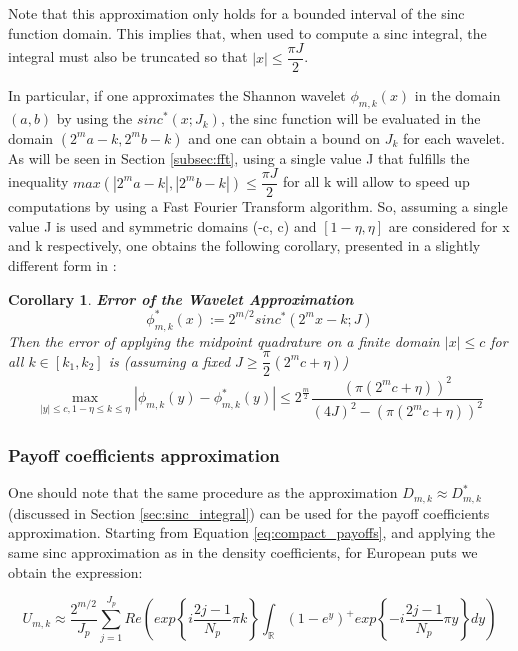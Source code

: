 \documentclass[12,twoside]{mammeTFM}
\newtheorem{cor}[thm]{Corollary}
\theoremstyle{definition}
\theoremstyle{remark}
\newcommand{\R}{\ensuremath{\mathbb{R}}}
\begin{document}
Note that this approximation only holds for a bounded interval of the sinc function domain. This implies that, when used to compute a sinc integral, the integral must also be truncated so that $|x| \leq \dfrac{\pi J}{2}$.

In particular, if one approximates the Shannon wavelet $\phi_{m,k}(x)$ in the domain $(a, b)$ by using the $sinc^{*}(x;J_k)$, the sinc function will be evaluated in the domain $(2^m a - k, 2^m b - k)$ and one can obtain a bound on $J_k$ for each wavelet. As will be seen in Section \ref{subsec:fft}, using a single value J that fulfills the inequality $max(|2^m a - k|, |2^m b - k|) \leq \dfrac{\pi J}{2}$ for all k will allow to speed up computations by using a Fast Fourier Transform algorithm. So, assuming a single value J is used and symmetric domains (-c, c) and $[1 - \eta, \eta]$ are considered for x and k respectively, one obtains the following corollary, presented in a slightly different form in \cite{mar17}:
\begin{cor} \textbf{Error of the Wavelet Approximation}
\begin{equation}
\phi_{m,k}^{*}(x) := 2^{m/2} sinc^{*}(2^m x -k; J)
\end{equation}
Then the error of applying the midpoint quadrature on a finite domain $|x| \leq c$ for all $k \in [k_1, k_2]$ is (assuming a fixed $J \geq \dfrac{\pi}{2}(2^m c + \eta)$) 
\begin{equation}
\max _{|y| \leq c, 1-\eta \leq k \leq \eta}\left|\phi_{m, k}(y)-\phi_{m, k}^{*}(y)\right| \leq 2^{\frac{m}{2}} \frac{\left(\pi\left(2^{m} c+\eta\right)\right)^{2}}{(4 J)^{2}-\left(\pi\left(2^{m} c+\eta\right)\right)^{2}}
\end{equation}
\end{cor}

\subsubsection{Payoff coefficients approximation} \label{subsec:payoff_coefficients}
One should note that the same procedure as the approximation $D_{m,k} \approx D_{m,k}^{*}$ (discussed in Section \ref{sec:sinc_integral}) can be used for the payoff coefficients approximation. Starting from Equation \ref{eq:compact_payoffs}, and applying the same sinc approximation as in the density coefficients, for European puts we obtain the expression:

\begin{equation}
U_{m,k} \approx \dfrac{2^{m/2}}{J_p}\sum_{j=1}^{J_p} Re \left( exp \left\{i \dfrac{2j - 1}{N_p} \pi k \right\} \int_{\R} (1 - e^y)^{+} exp \left\{-i \dfrac{2j - 1}{N_p} \pi y\right\} dy \right)
\end{equation}
\end{document}
